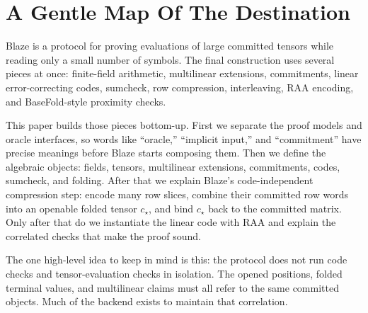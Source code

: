 \section{A Gentle Map Of The Destination}

Blaze is a protocol for proving evaluations of large committed tensors while
reading only a small number of symbols.  The final construction uses several
pieces at once: finite-field arithmetic, multilinear extensions, commitments,
linear error-correcting codes, sumcheck, row compression, interleaving, RAA
encoding, and BaseFold-style proximity checks.

This paper builds those pieces bottom-up.  First we separate the proof models
and oracle interfaces, so words like ``oracle,'' ``implicit input,'' and
``commitment'' have precise meanings before Blaze starts composing them.  Then
we define the algebraic objects: fields, tensors, multilinear extensions,
commitments, codes, sumcheck, and folding.  After that we explain Blaze's
code-independent compression step: encode many row slices, combine their
committed row words into an openable folded tensor $c_\star$, and bind
$c_\star$ back to the committed matrix.  Only after that do we instantiate the
linear code with RAA and explain the correlated checks that make the proof
sound.

The one high-level idea to keep in mind is this: the protocol does not run code
checks and tensor-evaluation checks in isolation.  The opened positions,
folded terminal values, and multilinear claims must all refer to the same
committed objects.  Much of the backend exists to maintain that correlation.
